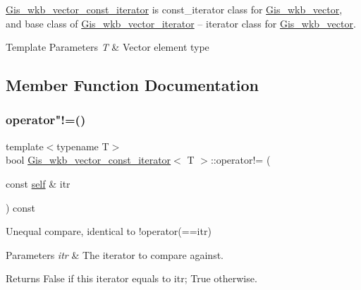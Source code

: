 \mbox{\hyperlink{classGis__wkb__vector__const__iterator}{Gis\+\_\+wkb\+\_\+vector\+\_\+const\+\_\+iterator}} is const\+\_\+iterator class for \mbox{\hyperlink{classGis__wkb__vector}{Gis\+\_\+wkb\+\_\+vector}}, and base class of \mbox{\hyperlink{classGis__wkb__vector__iterator}{Gis\+\_\+wkb\+\_\+vector\+\_\+iterator}} -- iterator class for \mbox{\hyperlink{classGis__wkb__vector}{Gis\+\_\+wkb\+\_\+vector}}. 
\begin{DoxyTemplParams}{Template Parameters}
{\em T} & Vector element type \\
\hline
\end{DoxyTemplParams}


\subsection{Member Function Documentation}
\mbox{\label{classGis__wkb__vector__const__iterator_aeb432555157e65155cb70be1e1061303}} 
\subsubsection{\texorpdfstring{operator"!=()}{operator!=()}}
{\footnotesize\ttfamily template$<$typename T$>$ \\
bool \mbox{\hyperlink{classGis__wkb__vector__const__iterator}{Gis\+\_\+wkb\+\_\+vector\+\_\+const\+\_\+iterator}}$<$ T $>$\+::operator!= (\begin{DoxyParamCaption}\item[{const \mbox{\hyperlink{classGis__wkb__vector__const__iterator}{self}} \&}]{itr }\end{DoxyParamCaption}) const\hspace{0.3cm}{\ttfamily [inline]}}



Unequal compare, identical to !operator(==itr) 


\begin{DoxyParams}{Parameters}
{\em itr} & The iterator to compare against. \\
\hline
\end{DoxyParams}
\begin{DoxyReturn}{Returns}
False if this iterator equals to itr; True otherwise. 
\end{DoxyReturn}
\mbox{\label{classGis__wkb__vector__const__iterator_ac11680118f26696dd591e9c5cbe1676a}} 
